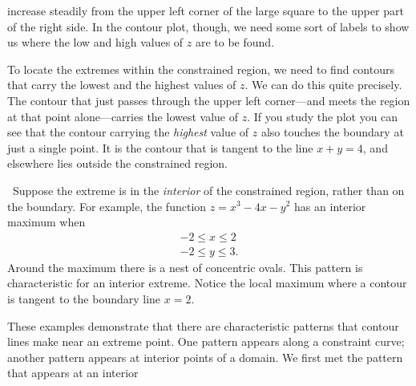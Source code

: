 {{{{\vspace{-9pt}
\noindent
increase steadily from the upper left corner of the large square to the upper part of the right side.  In the contour plot, though, we need some sort of labels to show us where the low and high values of $z$ are to be found.  

        To locate the extremes within the constrained region, we need to find contours that carry the lowest and the highest values of $z$.  We can do this quite precisely.  
The contour that just passes through the upper left corner---and meets the region at that point alone---carries the lowest value of $z$.  If you study the plot you can see that the contour carrying the {\em highest\/} value of $z$ also touches the boundary at just a single point.  It is the contour that is tangent to the line $x + y = 4$, and elsewhere lies outside the constrained region.    


\noindent
\quad \ Suppose the extreme is in the {\em interior\/} of the constrained region, rather than on the boundary.  For example, the function 
$z = x^3 - 4x - y^2$ has an interior maximum when
        \[
\begin{array}{l}
        -2 \leq x \leq 2        \\
        -2 \leq y \leq 3.
        \end{array}
\] 
Around the maximum there is a nest of concentric ovals.  This pattern is characteristic for an interior extreme.  Notice the local maximum where a contour is tangent to the boundary line $x = 2$.

        These examples demonstrate 
that there are characteristic patterns that contour lines make near an extreme point.  One pattern appears along a constraint \label{constraint} curve; another pattern appears at interior points of a domain.   We first met the pattern that appears at an interior
\linebreak
 
\vspace{12pt}
\vspace{100pt}

}}}}
